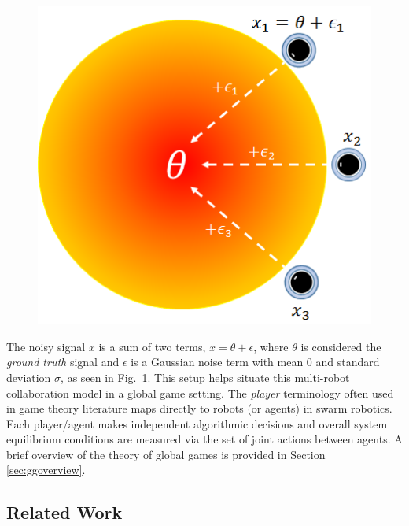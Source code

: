 \documentclass[conference]{ieeeconf}
\begin{document}
\begin{figure}[!ht]
\centering\includegraphics[width=.75\columnwidth]{../figures/globalgamesetup.png}
\centering\caption{}\label{fig:ggsetup}
\end{figure}

The noisy signal $x$ is a sum of two terms, $x = \theta + \epsilon$, where $\theta$ is considered the \emph{ground truth} signal and $\epsilon$ is a Gaussian noise term with mean $0$ and standard deviation $\sigma$, as seen in Fig.~\ref{fig:ggsetup}. This setup helps situate this multi-robot collaboration model in a global game setting. The \emph{player} terminology often used in game theory literature maps directly to robots (or agents) in swarm robotics. Each player/agent makes independent algorithmic decisions and overall system equilibrium conditions are measured via the set of joint actions between agents. A brief overview of the theory of global games is provided in Section \ref{sec:ggoverview}.

\subsection{Related Work}\label{subsec:rw}
\end{document}

